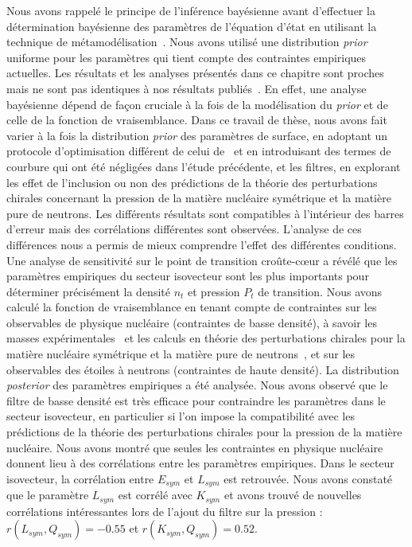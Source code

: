 Nous avons rappelé le principe de l'inférence bayésienne avant d'effectuer la  
détermination bayésienne des paramètres de l'équation d'état en utilisant la 
technique de métamodélisation~\cite{Margueron2018a}. Nous avons utilisé une 
distribution \textit{prior} uniforme pour les paramètres qui tient compte 
des contraintes empiriques actuelles. 
%
Les résultats et les analyses présentés dans ce chapitre sont proches mais ne 
sont pas identiques à nos résultats 
publiés~\cite{Carreau2019cc,Carreau2019moi}. 
En effet, une analyse bayésienne dépend de façon cruciale à la fois de la
modélisation du \textit{prior} et de celle de la fonction de vraisemblance. 
Dans ce travail de thèse, nous avons fait varier à la fois la distribution
\textit{prior} des paramètres de surface, en adoptant un protocole
d'optimisation différent de celui de~\cite{Carreau2019cc,Carreau2019moi} et en 
introduisant des termes de courbure qui ont été négligées dans l'étude 
précédente, et les filtres, en explorant les effet de l'inclusion ou non des 
prédictions de la théorie des perturbations chirales concernant la pression de 
la matière nucléaire symétrique et la matière pure de neutrons. 
Les différents résultats sont compatibles à l'intérieur des barres d'erreur 
mais des corrélations différentes sont observées. L'analyse de ces différences
nous a permis  de mieux comprendre l'effet des différentes conditions. 
%
Une analyse de sensitivité sur le point de transition croûte-c\oe ur a révélé 
que les paramètres empiriques du secteur isovecteur sont les plus importants 
pour déterminer précisément la densité $n_t$ et pression $P_t$ de transition. 
Nous avons calculé la fonction de vraisemblance en tenant compte de 
contraintes sur les observables de physique nucléaire (contraintes de basse
densité), à savoir les masses expérimentales~\cite{Huang2017} 
et les calculs en théorie des perturbations chirales pour la matière nucléaire
symétrique et la matière pure de neutrons~\cite{Drischler2016}, et sur les 
observables des étoiles à neutrons (contraintes de haute densité). 
La distribution \textit{posterior} des paramètres empiriques a été analysée. 
Nous avons observé que le filtre de basse densité est très efficace pour 
contraindre les paramètres dans le secteur isovecteur, en particulier si l'on 
impose la compatibilité avec les prédictions de la théorie des perturbations
chirales pour la pression de la matière nucléaire. 
Nous avons montré que seules les contraintes en physique nucléaire donnent lieu 
à des corrélations entre les paramètres empiriques. 
Dans le secteur isovecteur, la corrélation entre $E_{sym}$ et $L_{sym}$ est 
retrouvée. Nous avons constaté que le paramètre $L_{sym}$ est corrélé avec 
$K_{sym}$ et avons trouvé de nouvelles corrélations intéressantes lors de 
l'ajout du filtre sur la pression : $r(L_{sym},Q_{sym})=-0.55$ et 
$r(K_{sym},Q_{sym})=0.52$. 

